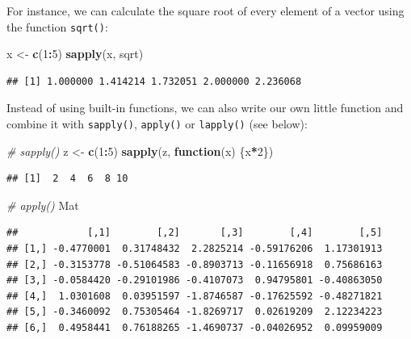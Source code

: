 \documentclass[
]{book}
\newenvironment{Shaded}{\begin{snugshade}}{\end{snugshade}}
\newcommand{\CommentTok}[1]{\textcolor[rgb]{0.56,0.35,0.01}{\textit{#1}}}
\newcommand{\ControlFlowTok}[1]{\textcolor[rgb]{0.13,0.29,0.53}{\textbf{#1}}}
\newcommand{\DecValTok}[1]{\textcolor[rgb]{0.00,0.00,0.81}{#1}}
\newcommand{\FunctionTok}[1]{\textcolor[rgb]{0.13,0.29,0.53}{\textbf{#1}}}
\newcommand{\NormalTok}[1]{#1}
\newcommand{\OtherTok}[1]{\textcolor[rgb]{0.56,0.35,0.01}{#1}}
\newcommand{\SpecialCharTok}[1]{\textcolor[rgb]{0.81,0.36,0.00}{\textbf{#1}}}
\begin{document}
For instance, we can calculate the square root of every element of a vector using the function \texttt{sqrt()}:

\begin{Shaded}
\begin{Highlighting}[]
\NormalTok{x }\OtherTok{\textless{}{-}} \FunctionTok{c}\NormalTok{(}\DecValTok{1}\SpecialCharTok{:}\DecValTok{5}\NormalTok{)}
\FunctionTok{sapply}\NormalTok{(x, sqrt)}
\end{Highlighting}
\end{Shaded}

\begin{verbatim}
## [1] 1.000000 1.414214 1.732051 2.000000 2.236068
\end{verbatim}

Instead of using built-in functions, we can also write our own little function and combine it with \texttt{sapply()}, \texttt{apply()} or \texttt{lapply()} (see below):

\begin{Shaded}
\begin{Highlighting}[]
\CommentTok{\# sapply()}
\NormalTok{z }\OtherTok{\textless{}{-}} \FunctionTok{c}\NormalTok{(}\DecValTok{1}\SpecialCharTok{:}\DecValTok{5}\NormalTok{)}
\FunctionTok{sapply}\NormalTok{(z, }\ControlFlowTok{function}\NormalTok{(x) \{x}\SpecialCharTok{*}\DecValTok{2}\NormalTok{\}) }
\end{Highlighting}
\end{Shaded}

\begin{verbatim}
## [1]  2  4  6  8 10
\end{verbatim}

\begin{Shaded}
\begin{Highlighting}[]
\CommentTok{\# apply()}
\NormalTok{Mat }
\end{Highlighting}
\end{Shaded}

\begin{verbatim}
##            [,1]        [,2]       [,3]        [,4]        [,5]
## [1,] -0.4770001  0.31748432  2.2825214 -0.59176206  1.17301913
## [2,] -0.3153778 -0.51064583 -0.8903713 -0.11656918  0.75686163
## [3,] -0.0584420 -0.29101986 -0.4107073  0.94795801 -0.40863050
## [4,]  1.0301608  0.03951597 -1.8746587 -0.17625592 -0.48271821
## [5,] -0.3460092  0.75305464 -1.8269717  0.02619209  2.12234223
## [6,]  0.4958441  0.76188265 -1.4690737 -0.04026952  0.09959009
\end{verbatim}
\end{document}
